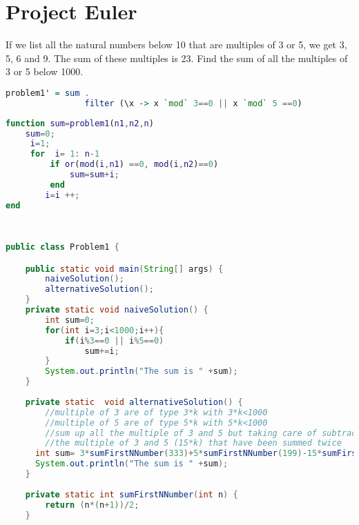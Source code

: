 \chapter{Project Euler}
\begin{problem}
If we list all the natural numbers below 10 that are multiples of 3 or 5, we get 3, 5, 6 and 9. The sum of these multiples is 23.
Find the sum of all the multiples of 3 or 5 below 1000.
 \end{problem}
 
 \begin{solution}

\begin{lstlisting}[language=Haskell, caption="Haskell"]
	problem1' = sum . 
	            filter (\x -> x `mod` 3==0 || x `mod` 5 ==0)
\end{lstlisting}


\begin{lstlisting}[language=Matlab, caption="Matlab"]
function sum=problem1(n1,n2,n)
	sum=0;
	 i=1;
     for  i= 1: n-1  
         if or(mod(i,n1) ==0, mod(i,n2)==0)
             sum=sum+i;
         end
	    i=i ++;
end   
\end{lstlisting}                         

\begin{lstlisting}[language=Java, caption="Java"]
                         

public class Problem1 {

	public static void main(String[] args) {
		naiveSolution();	
		alternativeSolution();
	}	
	private static void naiveSolution() {
		int sum=0;
		for(int i=3;i<1000;i++){
			if(i%3==0 || i%5==0)
				sum+=i;
		}
		System.out.println("The sum is " +sum);		
	}
	
	private static  void alternativeSolution() {
		//multiple of 3 are of type 3*k with 3*k<1000
		//multiple of 5 are of type 5*k with 5*k<1000
		//sum up all the multiple of 3 and 5 but taking care of subtracting once
		//the multiple of 3 and 5 (15*k) that have been summed twice
	  int sum= 3*sumFirstNNumber(333)+5*sumFirstNNumber(199)-15*sumFirstNNumber(66);
	  System.out.println("The sum is " +sum);	
	}
	
	private static int sumFirstNNumber(int n) {
		return (n*(n+1))/2;
	}
\end{lstlisting}

\end{solution}

